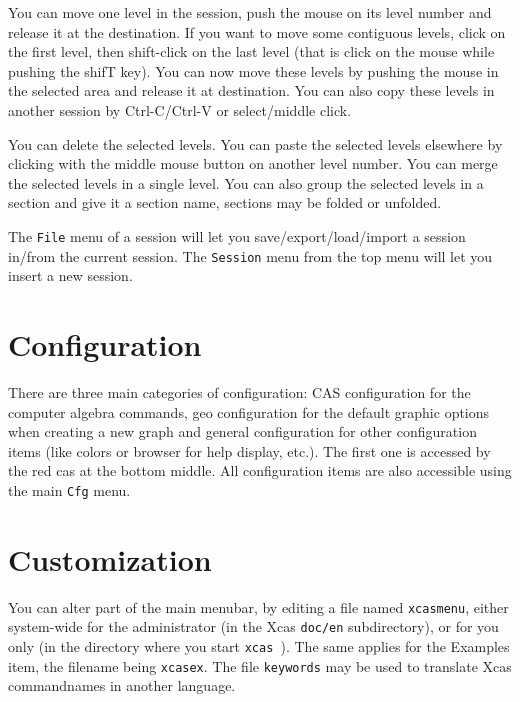 \documentclass{article}
\newcommand{\xcas}{{\tt xcas }}
\begin{document}
You can move one level in the session, push the mouse on its
level number and release it at the destination.
If you want to move some contiguous levels, click on
the first level, then shift-click on the last level (that
is click on the mouse while pushing the shifT key).
You can now move these levels by pushing the mouse in the
selected area and release it at destination.
You can also copy these levels in another session by 
Ctrl-C/Ctrl-V or select/middle click.

You can delete the selected levels. You can paste the
selected levels elsewhere by clicking with the middle mouse button 
on another level number. You can
merge the selected levels in a single level.
You can also group the selected levels in a section and
give it a section name, sections may be folded or unfolded.

The \verb|File| menu of a session will let you save/export/load/import
a session in/from the current session. The \verb|Session| menu 
from the top menu will let you insert a new session.

\section{Configuration}
There are three main categories of configuration: CAS configuration
for the computer algebra commands, geo configuration for the
default graphic options when creating a new graph and general
configuration for other configuration items (like colors
or browser for help display, etc.). The first one is
accessed by the red cas at the bottom middle. All
configuration items are also accessible using the main 
\verb|Cfg| menu.

\section{Customization}
You can alter part of the main menubar, by editing a file named
{\tt xcasmenu}, either system-wide for the administrator
(in the Xcas {\tt doc/en} subdirectory), or for you only
(in the directory where you start \xcas). The same applies
for the Examples item, the filename being {\tt xcasex}.
The file {\tt keywords} may be used to translate Xcas commandnames
in another language.
\end{document}
